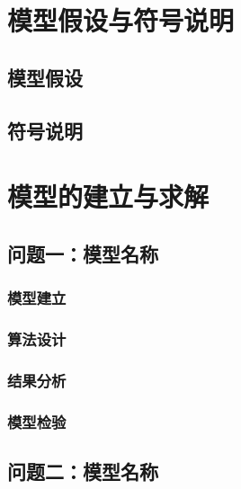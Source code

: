 \documentclass[withoutpreface,bwprint]{cumcmthesis}
\begin{document}
\section{模型假设与符号说明}
\subsection{模型假设}
\subsection{符号说明}

\section{模型的建立与求解}

\subsection{问题一：模型名称}
\subsubsection{模型建立}
\subsubsection{算法设计}
\subsubsection{结果分析}
\subsubsection{模型检验}

\subsection{问题二：模型名称}
\end{document}
